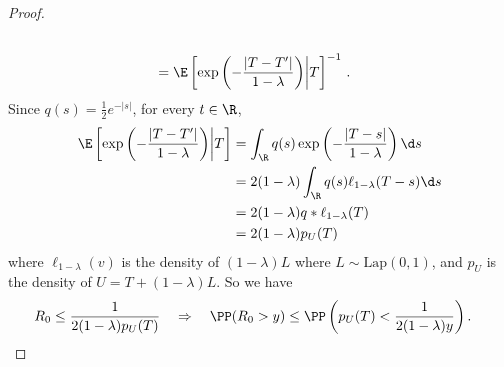 \begin{proof}
\begin{align}
        \\
         & =
        \E\left[
            \exp\left(
            -\frac{|T - T'|}{1-\lambda}
            \right)
            \middle | T
            \right]^{-1}\,.
        \label{eq:laplace_log_factor_R0_integral_upper}
    \end{align}
    Since $q(s)=\frac12e^{-|s|}$, for every $t\in\R$,
    \begin{align}
        \E\left[
            \exp\left(
            -\frac{|T - T'|}{1-\lambda}
            \right)
            \middle | T
            \right]
         & =
        \int_\R
        q(s)
        \exp\left(
        -\frac{|T-s|}{1-\lambda}
        \right)
        \d s
        \\
         & =
        2(1-\lambda)
        \int_\R
        q(s)
        \ell_{1-\lambda}(T-s)
        \d s
        \\
         & =
        2(1-\lambda) q * \ell_{1-\lambda}(T)
        \\
         & =
        2(1-\lambda) p_{U}(T)
        \label{eq:laplace_log_factor_laplace_convolution_lower}
    \end{align}
    where $\ell_{1-\lambda}(v)$ is the density of $(1-\lambda)L$ where $L\sim\mathrm{Lap}(0,1)$, and $p_U$ is the density of $U = T + (1-\lambda)L$.
    So we have
    \begin{align}
        R_0
         & \le
        \frac{1}{2(1-\lambda) p_U(T)}
        \quad
        \Rightarrow
        \quad
        \PP(R_0>y)
        \le
        \PP\left(p_U(T)<\frac{1}{2(1-\lambda)y}\right).
    \end{align}


\end{proof}

